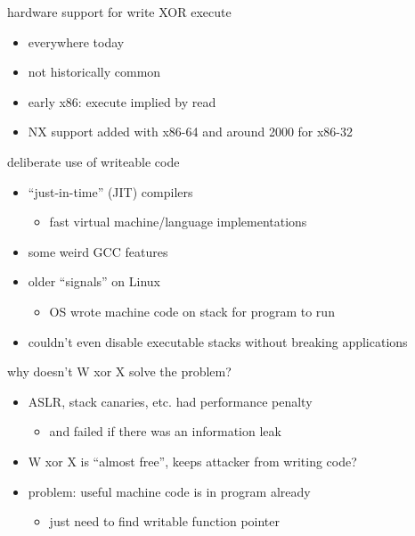 \begin{frame}{hardware support for write XOR execute}
    \begin{itemize}
    \item everywhere today
    \item not historically common
    \item early x86: execute implied by read
    \item NX support added with x86-64 and around 2000 for x86-32
    \end{itemize}
\end{frame}

\begin{frame}{deliberate use of writeable code}
    \begin{itemize}
    \item ``just-in-time'' (JIT) compilers
        \begin{itemize}
        \item fast virtual machine/language implementations
        \end{itemize}
    \item some weird GCC features
    \item older ``signals'' on Linux
        \begin{itemize}
        \item OS wrote machine code on stack for program to run
        \end{itemize}
    \item couldn't even disable executable stacks without breaking applications
    \end{itemize}
\end{frame}

\begin{frame}{why doesn't W xor X solve the problem?}
    \begin{itemize}
    \item ASLR, stack canaries, etc. had performance penalty
        \begin{itemize}
        \item and failed if there was an information leak
        \end{itemize}
    \item W xor X is ``almost free'', keeps attacker from writing code?
    \item problem: useful machine code is in program already
        \begin{itemize}
        \item just need to find writable function pointer
        \end{itemize}
    \end{itemize}
\end{frame}

